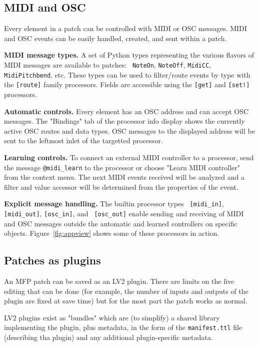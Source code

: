 \documentclass[a4paper]{article}
\def\:{\hskip0pt}
\begin{document}
\subsection{MIDI and OSC}

Every element in a patch can be controlled with MIDI or OSC
messages.  MIDI and OSC events can be easily handled, created,
and sent within a patch.

{\bf MIDI message types.} A set of Python types representing the
various flavors of MIDI messages are available to patches: {\tt
NoteOn}, {\tt NoteOff}, {\tt MidiCC}, {\tt MidiPitchbend}, etc.
These types can be used to filter/route events by type with the
{\tt [route]} family processors. Fields are accessible using the
{\tt [get]} and {\tt [set!]} processors.

{\bf Automatic controls.} Every element has an OSC address and
can accept OSC messages. The "Bindings" tab of the processor info
display shows the currently active OSC routes and data types. OSC
messages to the displayed address will be sent to the leftmost
inlet of the targetted processor.

{\bf Learning controls.} To connect an external MIDI controller to
a processor, send the message {\tt @midi\_learn} to the processor or
choose "Learn MIDI controller" from the context menu.
The next MIDI events received will be analyzed and a filter and
value accessor will be determined from the properties of the event.

{\bf Explicit message handling.} The builtin processor types {\tt
[midi\_in]}, {\tt [midi\_out]}, {\tt [osc\_in]}, and {\tt
[osc\_out]} enable sending and receiving of MIDI and OSC messages
outside the automatic and learned controllers on specific
objects. Figure~\ref{fig:appview} shows some of these processors
in action.


\subsection{Patches as plugins}

An MFP patch can be saved as an LV2 plugin. There are limits on the
live editing that can be done (for example, the number of inputs and
outputs of the plugin are fixed at save time) but for the most part
the patch works as normal.

LV2 plugins exist as "bundles" which are (to simplify) a shared
library implementing the plugin, plus metadata, in the form of
the {\tt manifest.ttl} file (describing tha plugin) and any
additional plugin\:-\:specific metadata.
\end{document}
